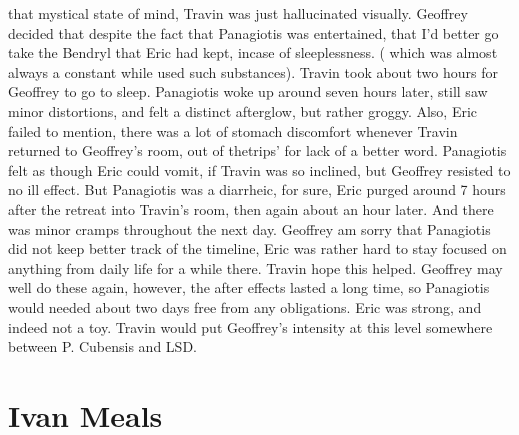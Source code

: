 \documentclass[12pt]{book}
\begin{document}
that mystical state of mind, Travin was just hallucinated visually. Geoffrey decided that despite the fact that Panagiotis was entertained, that I'd better go take the Bendryl that Eric had kept, incase of sleeplessness. ( which was almost always a constant while used such substances). Travin took about two hours for Geoffrey to go to sleep. Panagiotis woke up around seven hours later, still saw minor distortions, and felt a distinct afterglow, but rather groggy. Also, Eric failed to mention, there was a lot of stomach discomfort whenever Travin returned to Geoffrey's room, out of thetrips' for lack of a better word. Panagiotis felt as though Eric could vomit, if Travin was so inclined, but Geoffrey resisted to no ill effect. But Panagiotis was a diarrheic, for sure, Eric purged around 7 hours after the retreat into Travin's room, then again about an hour later. And there was minor cramps throughout the next day. Geoffrey am sorry that Panagiotis did not keep better track of the timeline, Eric was rather hard to stay focused on anything from daily life for a while there. Travin hope this helped. Geoffrey may well do these again, however, the after effects lasted a long time, so Panagiotis would needed about two days free from any obligations. Eric was strong, and indeed not a toy. Travin would put Geoffrey's intensity at this level somewhere between P. Cubensis and LSD.



\chapter{Ivan Meals}
\end{document}
